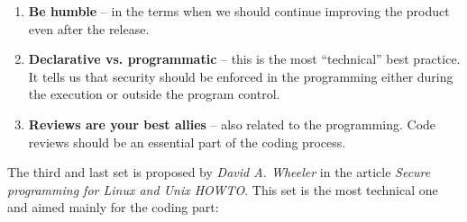 \documentclass[12pt,a4,twoside]{article}
\begin{document}
\begin{enumerate}
    \item \textbf{Be humble} -- in the terms when we should continue improving the product even after the release.
    \item \textbf{Declarative vs. programmatic} -- this is the most ``technical'' best practice. It tells us that security should be enforced in the programming either during the execution or outside the program control.
    \item \textbf{Reviews are your best allies} -- also related to the programming. Code reviews should be an essential part of the coding process.
\end{enumerate}

The third and last set is proposed by \textit{David A. Wheeler} in the article \textit{Secure programming for Linux and Unix HOWTO}. This set is the most technical one and aimed mainly for the coding part:
\end{document}
